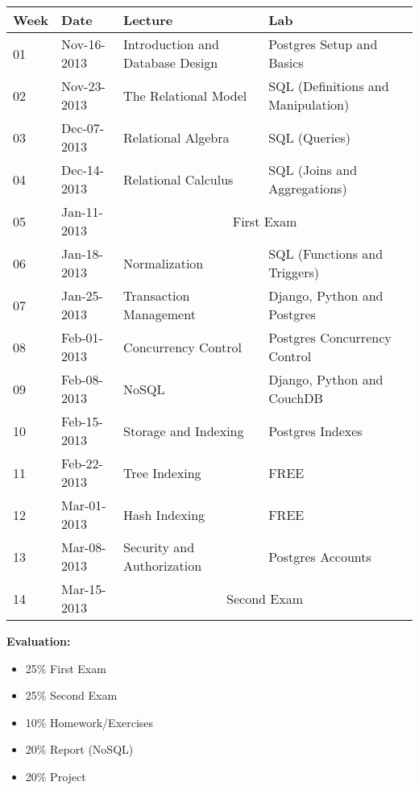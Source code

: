 \documentclass[12pt]{article}
\begin{document}
\begin{center}
  \begin{longtable}{ |l|l|l|l| }
    \hline
    Week & Date & Lecture & Lab \\ \hline
    01 & Nov-16-2013 & 
    	Introduction and Database Design & 
    	Postgres Setup and Basics \\ \hline
    02 & Nov-23-2013 & 
    	The Relational Model &
    	SQL (Definitions and Manipulation) \\ \hline
    03 & Dec-07-2013 & 
    	Relational Algebra & 
    	SQL (Queries) \\ \hline
    04 & Dec-14-2013 & 
    	Relational Calculus &
    	SQL (Joins and Aggregations) \\ \hline
    05 & Jan-11-2013 & 
    	\multicolumn{2}{|c|}{First Exam} \\ \hline
    06 & Jan-18-2013 & 
    	Normalization & 
    	SQL (Functions and Triggers) \\ \hline
    07 & Jan-25-2013 & 
		Transaction Management &
		Django, Python and Postgres  \\ \hline
    08 & Feb-01-2013 & 
		Concurrency Control &
		Postgres Concurrency Control  \\ \hline
    09 & Feb-08-2013 & 
		NoSQL &
    	Django, Python and CouchDB \\ \hline
    10 & Feb-15-2013 & 
	    Storage and Indexing &
		Postgres Indexes \\ \hline
    11 & Feb-22-2013 &
	    Tree Indexing &
		FREE \\ \hline
    12 & Mar-01-2013 &
	    Hash Indexing &
		FREE \\ \hline
    13 & Mar-08-2013 &
		Security and Authorization &
    	Postgres Accounts \\ \hline
    14 & Mar-15-2013 & \multicolumn{2}{|c|}{Second Exam}\\
    \hline
  \end{longtable}
\end{center}

\noindent\textbf{Evaluation:} 
\begin{itemize}
  \item[] 25\% First Exam
  \item[] 25\% Second Exam
  \item[] 10\% Homework/Exercises
  \item[] 20\% Report (NoSQL)
  \item[] 20\% Project
\end{itemize}
\end{document}
